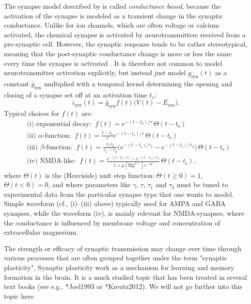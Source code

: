 The synapse model described by  is called \textit{conductance based}, because the activation of the synapse is modeled as a transient change in the synaptic conductance. Unlike for ion channels, which are often voltage or calcium activated, the chemical synapse is activated by neurotransmitters received from a pre-synaptic cell. However, the synaptic response tends to be rather stereotypical, meaning that the post-synaptic conductance change is more or less the same every time the synapse is activated . 
It is therefore not common to model neurotransmitter activation explicitly, but instead just
model $g_\text{syn}(t)$ as a constant $\bar{g}_\text{syn}$ multiplied with a temporal kernel determining the opening and closing of a synapse set off at an activation time $t_s$:
\begin{equation}
i_\text{syn}(t) = \bar{g}_\text{syn} f(t) \big(V(t)-E_\text{syn} \big).
\label{eq:Neuron:chemicalsynapse}
\end{equation}
Typical choices for $f(t)$ are: 
\begin{align}
&\text{(i) exponential decay:} \;\; f(t) = e^{-(t-t_\text{s})/\tau}\, \Theta(t-t_\text{s}) \\
&\text{(ii) $\alpha$-function:} \;\; f(t) =  \frac{t-t_\text{s}}{\tau} e^{-(t-t_\text{s})/\tau} \, \Theta(t-t_\text{s}) \\
&\text{(iii) $\beta$-function:} \;\; f(t) = \frac{\tau_1 \tau_2}{\tau_1-\tau_2} 
\Big( e^{-(t-t_\text{s})/\tau_1} - e^{-(t-t_\text{s})/\tau_2} \Big) \, \Theta(t-t_\text{s}) \\
& \text{(iv) NMDA-like:} \;\; f(t) = \frac{e^{-(t-t_\text{s})/\tau_1} - e^{-(t-t_\text{s})/\tau_2}} {1+\mu [\text{Mg}^{2+}] e^{-\gamma V} } \, \Theta(t-t_\text{s}),
\label{eq:Neuron:sf4}
\end{align}
where $\Theta(t)$ is the (Heaviside) unit step function: $\Theta(t \ge 0)=1$,  $\Theta(t< 0)=0$, and where parameters like $\gamma$,  $\tau$, $\tau_1$ and $\tau_2$ must be tuned to experimental data from the particular synapse type that one wants to model. Simple waveform (cf., (i)--(iii) above) typically used for AMPA  and GABA synapses, while the waveform (iv), is mainly relevant for NMDA-synapses, where the conductance is influenced by membrane voltage and concentration of extracellular magnesium. 

The strength or efficacy of synaptic transmission may change over time through various processes that are often grouped together under the term "synaptic plasticity". Synaptic plasticity work as a mechanism for learning and memory formation in the brain. It is a much studied topic that has been treated in several text books (see e.g., \citeasnoun**{Joel1993} or \citeasnoun**{Kreutz2012}). We will not go further into this topic here.


